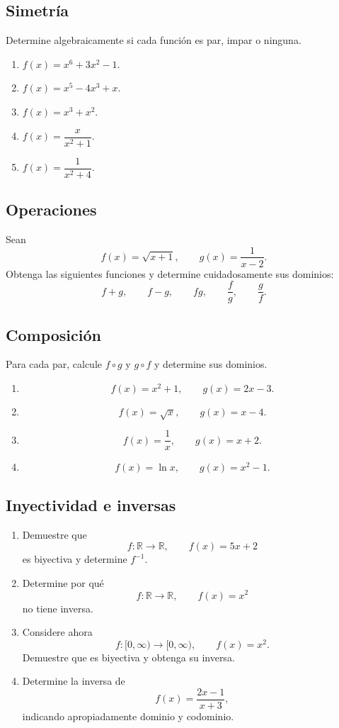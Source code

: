 \documentclass[12pt]{article}
\theoremstyle{remark}
\newcommand{\R}{\mathbb{R}}
\begin{document}
\subsection{Simetría}

Determine algebraicamente si cada función es par, impar o ninguna.

\begin{enumerate}
    \item $f(x)=x^6+3x^2-1$.
    \item $f(x)=x^5-4x^3+x$.
    \item $f(x)=x^3+x^2$.
    \item $f(x)=\dfrac{x}{x^2+1}$.
    \item $f(x)=\dfrac{1}{x^2+4}$.
\end{enumerate}

\subsection{Operaciones}

Sean
\[
f(x)=\sqrt{x+1},
\qquad
g(x)=\frac{1}{x-2}.
\]
Obtenga las siguientes funciones y determine cuidadosamente sus dominios:
\[
f+g,\qquad f-g,\qquad fg,\qquad\frac fg,\qquad\frac gf.
\]

\subsection{Composición}

Para cada par, calcule $f\circ g$ y $g\circ f$ y determine sus dominios.

\begin{enumerate}
    \item
    \[
    f(x)=x^2+1,\qquad g(x)=2x-3.
    \]
    \item
    \[
    f(x)=\sqrt{x},\qquad g(x)=x-4.
    \]
    \item
    \[
    f(x)=\frac1x,\qquad g(x)=x+2.
    \]
    \item
    \[
    f(x)=\ln x,\qquad g(x)=x^2-1.
    \]
\end{enumerate}

\subsection{Inyectividad e inversas}

\begin{enumerate}
    \item Demuestre que
    \[
    f:\R\to\R,\qquad f(x)=5x+2
    \]
    es biyectiva y determine $f^{-1}$.

    \item Determine por qué
    \[
    f:\R\to\R,\qquad f(x)=x^2
    \]
    no tiene inversa.

    \item Considere ahora
    \[
    f:[0,\infty)\to[0,\infty),\qquad f(x)=x^2.
    \]
    Demuestre que es biyectiva y obtenga su inversa.

    \item Determine la inversa de
    \[
    f(x)=\frac{2x-1}{x+3},
    \]
    indicando apropiadamente dominio y codominio.
\end{enumerate}
\end{document}
